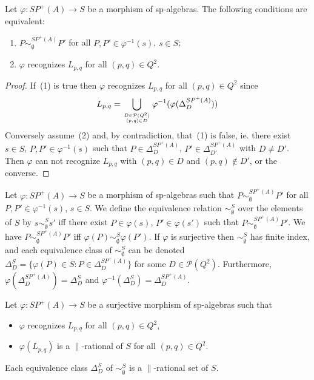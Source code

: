 \documentclass{CSML}
\begin{document}
\begin{lem}
  \label{lem:equivEmptyRecLpq}
  Let $\varphi:SP^+(A)\to S$ be a morphism of sp-algebras.
  The following conditions are equivalent:
  \begin{enumerate}
  \item $P\sim_\emptyset^{SP^+(A)} P'$ for all $P,P'\in\varphi^{-1}(s)$, $s\in S$;
  \item $\varphi$ recognizes $L_{p,q}$ for all $(p,q)\in Q^2$.
  \end{enumerate}
\end{lem}

\begin{proof}
  If~(1) is true then $\varphi$ recognizes $L_{p,q}$ for all $(p,q)\in Q^2$ since $$L_{p,q}=\mathop\bigcup_{D\in\mathcal{P}(Q^2)\atop(p,q)\in D}\varphi^{-1}(\varphi(\Delta^{SP^+(A)}_D))$$
  Conversely assume~(2) and, by contradiction, that~(1) is false, ie. there exist $s\in S$, $P,P'\in\varphi^{-1}(s)$ such that $P\in\Delta^{SP^+(A)}_D$, $P'\in\Delta^{SP^+(A)}_{D'}$ with $D\not=D'$. Then $\varphi$ can not recognize $L_{p,q}$ with  $(p,q)\in D$ and $(p,q)\not\in D'$, or the converse.
\end{proof}

Let $\varphi:SP^+(A)\to S$ be a morphism of sp-algebras such that $P\sim_\emptyset^{SP^+(A)} P'$ for all $P,P'\in\varphi^{-1}(s)$, $s\in S$. We define the equivalence relation $\sim_\emptyset^{S}$ over the elements of $S$ by $s\sim_\emptyset^{S} s'$ iff there exist $P\in \varphi(s)$, $P'\in \varphi(s')$ such that $P\sim_\emptyset^{SP^+(A)} P'$.
We have $P\sim_\emptyset^{SP^+(A)} P'$ iff $\varphi(P)\sim_\emptyset^{S} \varphi(P')$. 
If $\varphi$ is surjective then $\sim^S_\emptyset$ has finite index, and each equivalence class of $\sim_\emptyset^S$ can be denoted $\Delta_D^S=\{\varphi(P)\in S : P\in\Delta_D^{SP^+(A)}\}$ for some $D\in\mathcal{P}(Q^2)$. Furthermore, $\varphi(\Delta_D^{SP^+(A)})=\Delta_D^{S}$ and $\varphi^{-1}(\Delta_D^{S})=\Delta_D^{SP^+(A)}$.

\begin{lem}
  \label{lem:simEmptyParallelRational}
  Let $\varphi:SP^+(A)\to S$ be a surjective morphism of sp-algebras such that 
  \begin{itemize}
  \item $\varphi$ recognizes $L_{p,q}$ for all $(p,q)\in Q^2$,
  \item $\varphi(L_{p,q})$ is a $\parallel$-rational of $S$ for all $(p,q)\in Q^2$.
  \end{itemize}
  Each equivalence class $\Delta_D^S$ of $\sim_\emptyset^S$ is a $\parallel$-rational set of $S$.
\end{lem}
\end{document}
